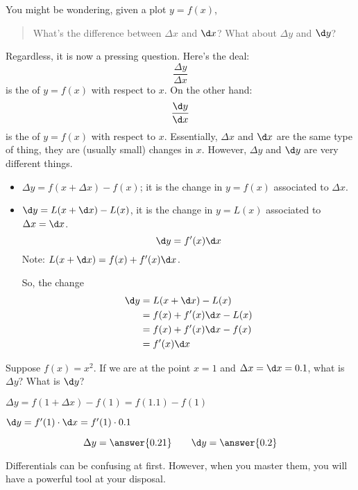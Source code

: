 \documentclass{ximera}
\begin{document}
You might be wondering, given a plot $y=f(x)$,
\begin{quote}
  What's the difference between $\Delta x$ and $\d x$? What about
  $\Delta y$ and $\d y$?
\end{quote}
Regardless, it is now a pressing question. Here's the deal: 
\[
\frac{\Delta y}{\Delta x}
\]
is the  of $y=f(x)$ with respect to $x$.
On the other hand:
\[
\frac{\d y}{\d x}
\]
is the  of $y=f(x)$ with respect to
$x$. Essentially, $\Delta x$ and $\d x$ are the same type of thing,
they are (usually small) changes in $x$. However, $\Delta y$ and $\d
y$ are very different things.
\begin{itemize}
\item $\Delta y=f(x+\Delta x)-f(x)$; it  is the change in $y=f(x)$ associated to $\Delta x$.
\item $\d y=L(x+\d x)-L(x)$, it is the change in $y=L(x)$ associated to $\Delta x=\d x$.
  \[
  \d y =f'(x)\d x
  \]
  Note: $ L(x+\d x)= f(x)+f'(x)\d x$.
   
  So, the change
  \begin{align*}
    \d y &= L(x+\d x)-L(x)\\
    &= f(x)+f'(x)\d x-L(x)\\
    &= f(x)+f'(x)\d x-f(x)\\
    &=f'(x)\d x
  \end{align*}
\end{itemize}
\begin{question}
  Suppose $f(x) = x^2$. If we are at the point $x=1$ and $\Delta x =\d x
  = 0.1$, what is $\Delta y$? What is $\d y$?
  \begin{hint}
 $ \Delta y=f(1+\Delta x)-f(1)=f(1.1)-f(1)$
    \end{hint}
      \begin{hint}
 $\d y=f'(1)\cdot\d x=f'(1)\cdot0.1$
    \end{hint}
  \begin{prompt}
    \[
    \Delta y = \answer{0.21}\qquad \d y = \answer{0.2}
    \]
  \end{prompt}
\end{question}
Differentials can be confusing at first. However, when you master
them, you will have a powerful tool at your disposal.
\end{document}
